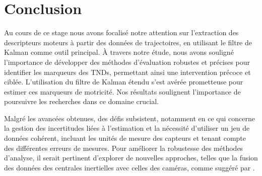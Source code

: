 \documentclass[5pt]{article}
\begin{document}
\section{Conclusion}
Au cours de ce stage nous avons  focalisé notre attention sur l'extraction des descripteurs moteurs à partir des données de trajectoires, en utilisant le filtre de Kalman comme outil principal. À travers notre étude, nous avons souligné l'importance de développer des méthodes d'évaluation robustes et précises pour identifier les marqueurs des TNDs, permettant ainsi une intervention précoce et ciblée. L'utilisation du filtre de Kalman étendu s'est avérée prometteuse pour estimer ces marqueurs de motricité. Nos résultats soulignent l'importance de poursuivre les recherches dans ce domaine crucial. 

Malgré les avancées obtenues, des défis subsistent, notamment en ce qui concerne la gestion des incertitudes liées à l'estimation et la nécessité d'utiliser un jeu de données cohérent, incluant les unités de mesure des capteurs et tenant compte des différentes erreurs de mesures. Pour améliorer la robustesse des méthodes d'analyse, il serait pertinent d'explorer de nouvelles approches, telles que la fusion des données des centrales inertielles avec celles des caméras, comme suggéré par \textcite{ouss_developmental_2018}.
\newpage
\printbibliography
\newpage
\end{document}
